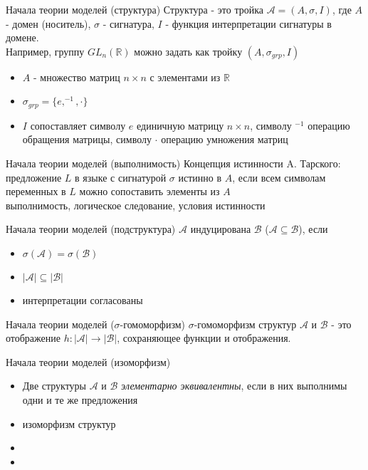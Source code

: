 \documentclass{beamer}
\begin{document}
\begin{frame}{Начала теории моделей (структура)}
Структура - это тройка $\mathcal{A} = (A, \sigma, I)$, где $A$ - домен (носитель), $\sigma$ - сигнатура, $I$ - функция интерпретации сигнатуры в домене.\\
\bigskip
Например, группу $GL_n(\mathbb{R})$ можно задать как тройку $(A, \sigma_{grp}, I)$\\
  \begin{itemize}
    \item $A$ - множество матриц $n \times n$ с элементами из $\mathbb{R}$
    \item $\sigma_{grp} = \{e, ^{-1}, \cdot\}$
    \item $I$ сопоставляет символу $e$ единичную матрицу $n \times n$, символу $^{-1}$ операцию обращения матрицы, символу $\cdot$ операцию умножения матриц
  \end{itemize}
\end{frame}

\begin{frame}{Начала теории моделей (выполнимость)}
Концепция истинности A. Тарского: предложение $L$ в языке с сигнатурой $\sigma$ истинно в $A$, если всем символам переменных в $L$ можно сопоставить элементы из $A$\\
выполнимость, логическое следование, условия истинности
\end{frame}

\begin{frame}{Начала теории моделей (подструктура)}
$\mathcal{A}$ индуцирована $\mathcal{B}$ ($\mathcal{A} \subseteq \mathcal{B}$), если\\
  \begin{itemize}
    \item $\sigma(\mathcal{A}) = \sigma(\mathcal{B})$
    \item $\left\vert \mathcal{A} \right\vert \subseteq \left\vert \mathcal{B} \right\vert$
    \item интерпретации согласованы
  \end{itemize}
\end{frame}

\begin{frame}{Начала теории моделей ($\sigma$-гомоморфизм)}
$\sigma$-гомоморфизм структур $\mathcal{A}$ и $\mathcal{B}$ - это отображение $h : \left\vert \mathcal{A} \right\vert \to \left\vert \mathcal{B} \right\vert$, сохраняющее функции и отображения.
\end{frame}

\begin{frame}{Начала теории моделей (изоморфизм)}
  \begin{itemize}
    \item Две структуры $\mathcal{A}$ и $\mathcal{B}$ \textit{элементарно эквивалентны}, если в них выполнимы одни и те же предложения
    \item изоморфизм структур
    \item 
    \item 
  \end{itemize}
\end{frame}
\end{document}
